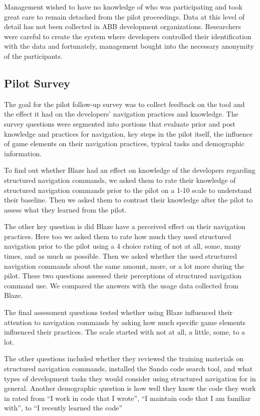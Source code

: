 \documentclass{sig-alternate}
\begin{document}
Management wished to have no knowledge of who was participating and took great care to remain detached from the pilot proceedings.  Data at this level of detail has not been collected in ABB development organizations.  Researchers were careful to create the system where developers controlled their identification with the data and fortunately, management bought into the necessary anonymity of the participants.

\subsection{Pilot Survey}

The goal for the pilot follow-up survey was to collect feedback on the tool and the effect it had on the developers' navigation practices and knowledge.  The survey questions were segmented into portions that evaluate prior and post knowledge and practices for navigation, key steps in the pilot itself, the influence of game elements on their navigation practices, typical tasks and demographic information.

To find out whether Blaze had an effect on knowledge of the developers regarding structured navigation commands, we asked them to rate their knowledge of structured navigation commands prior to the pilot on a 1-10 scale to understand their baseline.  Then we asked them to contrast their knowledge after the pilot to assess what they learned from the pilot.

The other key question is did Blaze have a perceived effect on their navigation practices.  Here too we asked them to rate how much they used structured navigation prior to the pilot using a 4 choice rating of not at all, some, many times, and as much as possible.  Then we asked whether the used structured navigation commands about the same amount, more,  or a lot more during the pilot.  These two questions assessed their perceptions of structured navigation command use.  We compared the answers with the usage data collected from Blaze.

The final assessment questions tested whether using Blaze influenced their attention to navigation commands by asking how much specific game elements influenced their practices.  The scale started with not at all, a little, some, to a lot.  

The other questions included whether they reviewed the training materials on structured navigation commands, installed the Sando code search tool, and what types of development tasks they would consider using structured navigation for in general.  Another demographic question is how well they know the code they work in rated from ``I work in code that I wrote'', ``I maintain code that I am familiar with'', to ``I recently learned the code''
\end{document}
